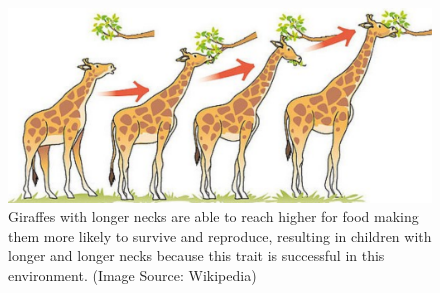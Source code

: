 \documentclass[a4paper,12pt]{report}
\numberwithin{equation}{section}
\theoremstyle{definition}
\begin{document}
\begin{figure}[H]
  \centerline{\includegraphics[width=14cm]{giraffes}}
  \caption{Giraffes with longer necks are able to reach higher for food making them more likely to survive and reproduce, resulting in children with longer and longer necks because this trait is successful in this environment. (Image Source: Wikipedia) }
  \label{fig:giraffes}
\end{figure}
\end{document}
